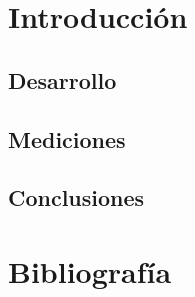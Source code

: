 \documentclass[a4paper,10pt]{article}
\begin{document}

\newpage
\tableofcontents
\newpage


\section{Introducción} 
\label{sec:intro}

\subsection{Desarrollo}
\label{sec:desarrollo}
%

\subsection{Mediciones}
\label{sec:mediciones}
%

\subsection{Conclusiones}
\label{sec:conclusiones}
%


\section{Bibliografía}
\end{document}
